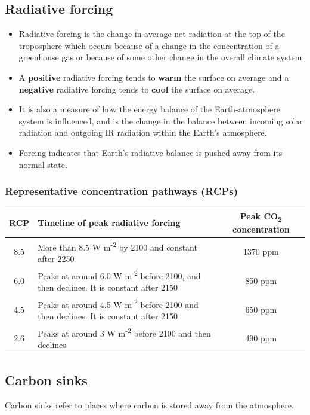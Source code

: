 \documentclass[11pt]{article}
\begin{document}
\subsection{Radiative forcing}
\label{sec:org7bbd7e9}
\begin{itemize}
\item Radiative forcing is the change in average net radiation at the top of the troposphere which occurs because of a change in the concentration of a greenhouse gas or because of some other change in the overall climate system.
\item A \textbf{positive} radiative forcing tends to \textbf{warm} the surface on average and a \textbf{negative} radiative forcing tends to \textbf{cool} the surface on average.
\item It is also a measure of how the energy balance of the Earth-atmosphere system is influenced, and is the change in the balance between incoming solar radiation and outgoing IR radiation within the Earth's atmosphere.
\item Forcing indicates that Earth's radiative balance is pushed away from its normal state.
\end{itemize}
\subsubsection{Representative concentration pathways (RCPs)}
\label{sec:orgf5f6e62}
\begin{center}
\begin{tabular}{|c|m{17em}|c|}
\hline
\textbf{RCP} & \textbf{Timeline of peak radiative forcing} & \textbf{Peak CO\textsubscript{2} concentration}\\
\hline
8.5 & More than 8.5 W m\textsuperscript{-2} by 2100 and constant after 2250 & 1370 ppm\\
\hline
6.0 & Peaks at around 6.0 W m\textsuperscript{-2} before 2100, and then declines. It is constant after 2150 & 850 ppm\\
\hline
4.5 & Peaks at around 4.5 W m\textsuperscript{-2} before 2100 and then declines. It is constant after 2150 & 650 ppm\\
\hline
2.6 & Peaks at around 3 W m\textsuperscript{-2} before 2100 and then declines & 490 ppm\\
\hline
\end{tabular}
\end{center}
\subsection{Carbon sinks}
\label{sec:org88dbec9}
Carbon sinks refer to places where carbon is stored away from the atmosphere.
\end{document}
